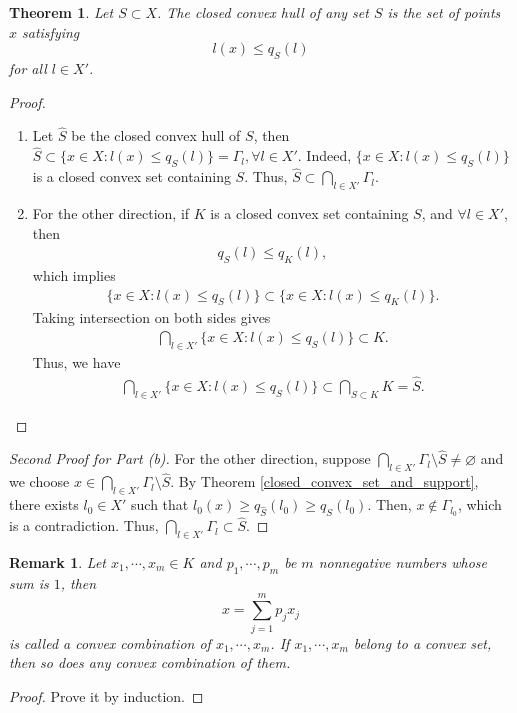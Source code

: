 \documentclass[11pt]{book}
\newtheorem{theorem}{Theorem}[chapter]
\newtheorem{remark}{Remark}[chapter]
\theoremstyle{definition}
\numberwithin{equation}{chapter}
\begin{document}
\begin{theorem}
Let $S \subset X$. The closed convex hull of any set $S$ is the set of points $x$ satisfying 
$$l(x) \leq q_S(l)$$ 
for all $l \in X'$.
\end{theorem}
\begin{proof}
~\begin{enumerate}[label=(\alph*)]
    \item Let $\hat{S}$ be the closed convex hull of $S$, then $\hat{S} \subset \{x \in X: l(x) \leq q_S(l)\} = \Gamma_l, \forall l \in X'$. Indeed, $\{x \in X: l(x) \leq q_S(l)\}$ is a closed convex set containing $S$. Thus, $\hat{S} \subset \bigcap_{l \in X'} \Gamma_l$.
    
    \item For the other direction, if $K$ is a closed convex set containing $S$, and $\forall l \in X'$, then 
    \begin{align*}
        q_S(l) \leq q_K(l),
    \end{align*}
    which implies
    \begin{align*}
        \{x \in X: l(x) \leq q_S(l)\} \subset \{x \in X: l(x) \leq q_K(l)\}.
    \end{align*}
    Taking intersection on both sides gives
    \begin{align*}
        \bigcap_{l \in X'} \{x \in X: l(x) \leq q_S(l)\} \subset K.
    \end{align*}
    Thus, we have
    \begin{align*}
        \bigcap_{l \in X'} \{x \in X: l(x) \leq q_S(l)\} \subset \bigcap_{S \subset K} K = \hat{S}.
    \end{align*}
\end{enumerate}
\end{proof}

\begin{proof}[Second Proof for Part (b)] \cite{26}
For the other direction, suppose $\bigcap_{l \in X'} \Gamma_l \setminus \hat{S} \neq \varnothing$ and we choose $x \in \bigcap_{l \in X'} \Gamma_l \setminus \hat{S}$. By Theorem \ref{closed_convex_set_and_support}, there exists $l_0 \in X'$ such that $l_0(x) \geq q_{\hat{S}}(l_0) \geq q_S(l_0)$. Then, $x \notin \Gamma_{l_0}$, which is a contradiction. Thus, $\bigcap_{l \in X'} \Gamma_l \subset \hat{S}$.
\end{proof}

\begin{remark}
Let $x_1, \cdots, x_m \in K$ and $p_1, \cdots, p_m$ be $m$ nonnegative numbers whose sum is $1$, then 
$$x = \sum^m_{j=1} p_j x_j$$ 
is called a convex combination of $x_1, \cdots, x_m$. If $x_1, \cdots, x_m$ belong to a convex set, then so does any convex combination of them.
\end{remark}
\begin{proof}
Prove it by induction.
\end{proof}
\end{document}
